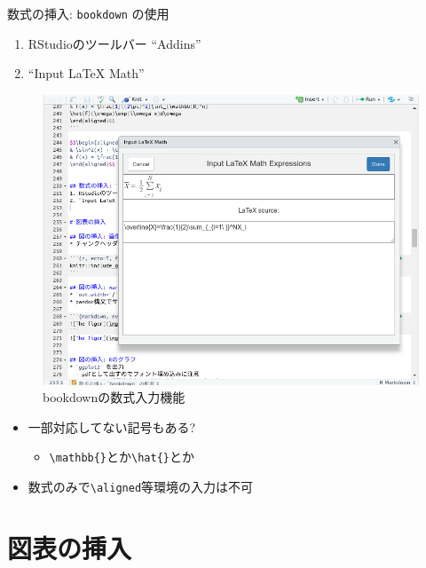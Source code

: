 \documentclass[
  14pt,
  ignorenonframetext,
]{beamer}
\providecommand{\tightlist}{%
  \setlength{\itemsep}{0pt}\setlength{\parskip}{0pt}}
\begin{document}
\begin{frame}[fragile]{数式の挿入: \texttt{bookdown} の使用}
\protect\hypertarget{ux6570ux5f0fux306eux633fux5165-bookdown-ux306eux4f7fux7528}{}

\begin{enumerate}
\tightlist
\item
  RStudioのツールバー ``Addins''
\item
  ``Input LaTeX Math''
\end{enumerate}

\begin{figure}

{\centering \includegraphics[width=0.5\linewidth,height=0.4\textheight]{img/math-input} 

}

\caption{bookdownの数式入力機能}\label{fig:math-input}
\end{figure}

\begin{itemize}
\tightlist
\item
  一部対応してない記号もある?

  \begin{itemize}
  \tightlist
  \item
    \texttt{\textbackslash{}mathbb\{\}}とか\texttt{\textbackslash{}hat\{\}}とか
  \end{itemize}
\item
  数式のみで\texttt{\textbackslash{}aligned}等環境の入力は不可
\end{itemize}

\end{frame}

\hypertarget{ux56f3ux8868ux306eux633fux5165}{%
\section{図表の挿入}\label{ux56f3ux8868ux306eux633fux5165}}
\end{document}
